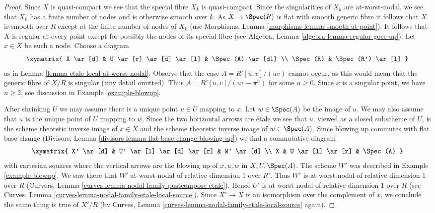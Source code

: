 \begin{proof}
Since $X$ is quasi-compact we see that the special fibre $X_k$ is quasi-compact.
Since the singularities of $X_k$ are at-worst-nodal, we see
that $X_k$ has a finite number of nodes and is otherwise
smooth over $k$. As $X \to \Spec(R)$ is flat with smooth generic
fibre it follows that $X$ is smooth over $R$ except at the
finite number of nodes of $X_k$
(use Morphisms, Lemma \ref{morphisms-lemma-smooth-at-point}).
It follows that $X$ is regular at every point except for possibly
the nodes of its special fibre
(see Algebra, Lemma \ref{algebra-lemma-regular-goes-up}).
Let $x \in X$ be such a node.
Choose a diagram
$$
\xymatrix{
X \ar[d] &
U \ar[r] \ar[d] \ar[l] &
\Spec(A) \ar[dl] \\
\Spec(R) &
\Spec(R') \ar[l]
}
$$
as in Lemma \ref{lemma-etale-local-at-worst-nodal}.
Observe that the case $A = R'[u, v]/(uv)$ cannot
occur, as this would mean that the generic fibre of
$X/R$ is singular (tiny detail omitted). Thus $A = R'[u, v]/(uv - \pi^n)$
for some $n \geq 0$. Since $x$ is a singular point,
we have $n \geq 2$, see discussion in
Example \ref{example-blowup}.

\medskip\noindent
After shrinking $U$ we may assume there is
a unique point $u \in U$ mapping to $x$.
Let $w \in \Spec(A)$ be the image of $u$.
We may also assume that $u$ is the unique point of $U$
mapping to $w$.
Since the two horizontal arrows are \'etale
we see that $u$, viewed as a closed subscheme of $U$,
is the scheme theoretic inverse image of $x \in X$ and the
scheme theoretic inverse image of $w \in \Spec(A)$.
Since blowing up commutes with flat base change
(Divisors, Lemma \ref{divisors-lemma-flat-base-change-blowing-up})
we find a commutative diagram
$$
\xymatrix{
X' \ar[d] &
U' \ar[l] \ar[d] \ar[r] &
W' \ar[d] \\
X & U \ar[l] \ar[r] & \Spec(A)
}
$$
with cartesian squares where the vertical arrows are the blowing
up of $x, u, w$ in $X, U, \Spec(A)$. The scheme $W'$ was described
in Example \ref{example-blowup}. We saw there that $W'$
at-worst-nodal of relative dimension $1$ over $R'$. Thus
$W'$ is at-worst-nodal of relative dimension $1$ over $R$
(Curvers, Lemma \ref{curves-lemma-nodal-family-postcompose-etale}).
Hence $U'$ is at-worst-nodal of relative dimension $1$ over $R$
(see Curves, Lemma \ref{curves-lemma-nodal-family-etale-local-source}).
Since $X' \to X$ is an isomorphism over the complement of $x$,
we conclude the same thing is true of $X'/R$ (by
Curves, Lemma \ref{curves-lemma-nodal-family-etale-local-source}
again).


\end{proof}
